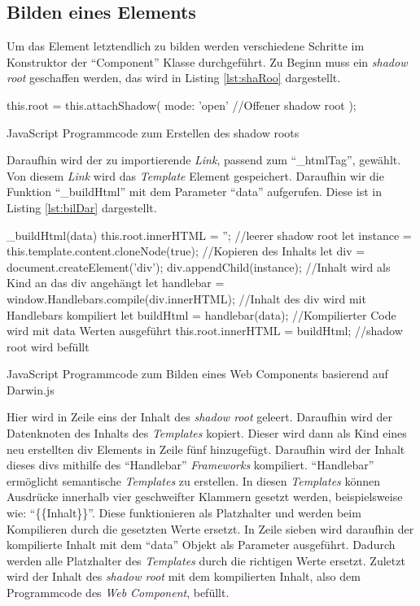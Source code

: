 \documentclass[12pt, paper=a4, bibtotoc, toc=listof, headsepline=true, numbers=endperiod]{scrreprt}
\begin{document}
	\subsection{Bilden eines Elements}
	Um das Element letztendlich zu bilden werden verschiedene Schritte im Konstruktor der \enquote{Component} Klasse durchgeführt. Zu Beginn muss ein \emph{shadow root} geschaffen werden, das wird in Listing \ref{lst:shaRoo} dargestellt.
	\begin{listing}
		\begin{JavaScriptcode*}{}
this.root = this.attachShadow({
   mode: 'open' //Offener shadow root
});
		\end{JavaScriptcode*}
		\caption[Erstellung des shadow roots]{JavaScript Programmcode zum Erstellen des shadow roots}
		\label{lst:shaRoo}  
	\end{listing}
	Daraufhin wird der zu importierende \emph{Link}, passend zum \enquote{\_htmlTag}, gewählt. Von diesem \emph{Link} wird das \emph{Template} Element gespeichert. Daraufhin wir die Funktion \enquote{\_buildHtml} mit dem Parameter \enquote{data} aufgerufen. Diese ist in Listing \ref{lst:bilDar} dargestellt.
		\begin{listing}
		\begin{JavaScriptcode*}{}
_buildHtml(data) {
   this.root.innerHTML = ''; //leerer shadow root
   let instance = this.template.content.cloneNode(true); //Kopieren des Inhalts
   let div = document.createElement('div'); 
   div.appendChild(instance); //Inhalt wird als Kind an das div angehängt
   let handlebar = window.Handlebars.compile(div.innerHTML); //Inhalt des div wird mit Handlebars kompiliert
   let buildHtml = handlebar(data); //Kompilierter Code wird mit data Werten ausgeführt
   this.root.innerHTML = buildHtml; //shadow root wird befüllt
}
		\end{JavaScriptcode*}
		\caption[Bilden des Web Components]{JavaScript Programmcode zum Bilden eines Web Components basierend auf Darwin.js}
		\label{lst:bilDar}
		\end{listing}
	Hier wird in Zeile eins der Inhalt des \emph{shadow root} geleert. Daraufhin wird der Datenknoten des Inhalts des \emph{Templates} kopiert. Dieser wird dann als Kind eines neu erstellten div Elements in Zeile fünf hinzugefügt. Daraufhin wird der Inhalt dieses divs mithilfe des \enquote{Handlebar} \emph{Frameworks} kompiliert. \enquote{Handlebar} ermöglicht semantische \emph{Templates} zu erstellen. In diesen \emph{Templates} können Ausdrücke innerhalb vier geschweifter Klammern gesetzt werden, beispielsweise wie: \enquote{\{\{Inhalt\}\}}. Diese funktionieren als Platzhalter und werden beim Kompilieren durch die gesetzten Werte ersetzt\cite{handlebars}. In Zeile sieben wird daraufhin der kompilierte Inhalt mit dem \enquote{data} Objekt als Parameter ausgeführt. Dadurch werden alle Platzhalter des \emph{Templates} durch die richtigen Werte ersetzt. Zuletzt wird der Inhalt des \emph{shadow root} mit dem kompilierten Inhalt, also dem Programmcode des \emph{Web Component}, befüllt.
\end{document}
